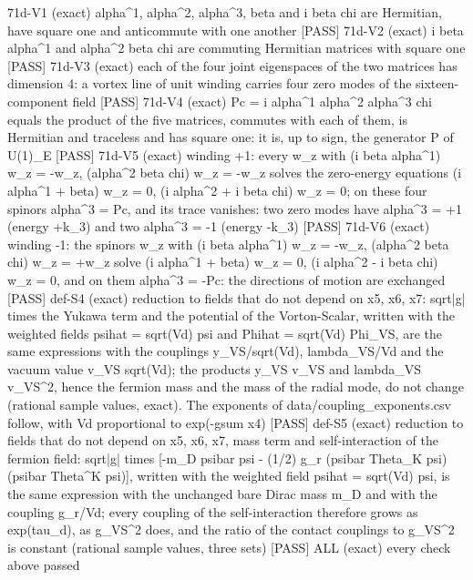 \documentclass[
  10pt,
]{article}
\newenvironment{Shaded}{}{}
\newcommand{\NormalTok}[1]{#1}
\begin{document}
\begin{Shaded}
\begin{Highlighting}[]
\NormalTok{[PASS] 71d{-}V1  (exact) alpha\^{}1, alpha\^{}2, alpha\^{}3, beta and i beta chi are Hermitian, have square one and anticommute with one another}
\NormalTok{[PASS] 71d{-}V2  (exact) i beta alpha\^{}1 and alpha\^{}2 beta chi are commuting Hermitian matrices with square one}
\NormalTok{[PASS] 71d{-}V3  (exact) each of the four joint eigenspaces of the two matrices has dimension 4: a vortex line of unit winding carries four zero modes of the sixteen{-}component field}
\NormalTok{[PASS] 71d{-}V4  (exact) Pc = i alpha\^{}1 alpha\^{}2 alpha\^{}3 chi equals the product of the five matrices, commutes with each of them, is Hermitian and traceless and has square one: it is, up to sign, the generator P of U(1)\_E}
\NormalTok{[PASS] 71d{-}V5  (exact) winding +1: every w\_z with (i beta alpha\^{}1) w\_z = {-}w\_z, (alpha\^{}2 beta chi) w\_z = {-}w\_z solves the zero{-}energy equations (i alpha\^{}1 + beta) w\_z = 0, (i alpha\^{}2 + i beta chi) w\_z = 0; on these four spinors alpha\^{}3 = Pc, and its trace vanishes: two zero modes have alpha\^{}3 = +1 (energy +k\_3) and two alpha\^{}3 = {-}1 (energy {-}k\_3)}
\NormalTok{[PASS] 71d{-}V6  (exact) winding {-}1: the spinors w\_z with (i beta alpha\^{}1) w\_z = {-}w\_z, (alpha\^{}2 beta chi) w\_z = +w\_z solve (i alpha\^{}1 + beta) w\_z = 0, (i alpha\^{}2 {-} i beta chi) w\_z = 0, and on them alpha\^{}3 = {-}Pc: the directions of motion are exchanged}
\NormalTok{[PASS] def{-}S4  (exact) reduction to fields that do not depend on x5, x6, x7: sqrt|g| times the Yukawa term and the potential of the Vorton{-}Scalar, written with the weighted fields psihat = sqrt(Vd) psi and Phihat = sqrt(Vd) Phi\_VS, are the same expressions with the couplings y\_VS/sqrt(Vd), lambda\_VS/Vd and the vacuum value v\_VS sqrt(Vd); the products y\_VS v\_VS and lambda\_VS v\_VS\^{}2, hence the fermion mass and the mass of the radial mode, do not change (rational sample values, exact). The exponents of data/coupling\_exponents.csv follow, with Vd proportional to exp({-}gsum x4)}
\NormalTok{[PASS] def{-}S5  (exact) reduction to fields that do not depend on x5, x6, x7, mass term and self{-}interaction of the fermion field: sqrt|g| times [{-}m\_D psibar psi {-} (1/2) g\_r (psibar Theta\_K psi)(psibar Theta\^{}K psi)], written with the weighted field psihat = sqrt(Vd) psi, is the same expression with the unchanged bare Dirac mass m\_D and with the coupling g\_r/Vd; every coupling of the self{-}interaction therefore grows as exp(tau\_d), as g\_VS\^{}2 does, and the ratio of the contact couplings to g\_VS\^{}2 is constant (rational sample values, three sets)}
\NormalTok{[PASS] ALL  (exact) every check above passed}
\end{Highlighting}
\end{Shaded}
\end{document}
